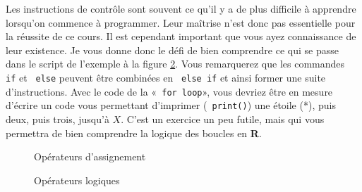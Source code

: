 \documentclass[10.5pt,a4paper]{article}
\newcommand{\rcode}[1]{\texttt{\color{rstudio} #1}}
\begin{document}
    Les instructions de contrôle sont souvent ce qu'il y a de plus difficile à apprendre lorsqu'on commence à programmer. Leur maîtrise n'est donc pas essentielle pour la réussite de ce cours. Il est cependant important que vous ayez connaissance de leur existence. Je vous donne donc le défi de bien comprendre ce qui se passe dans le script de l'exemple à la figure \ref{opeLogi}. Vous remarquerez que les commandes \rcode{if} et \rcode{else} peuvent être combinées en \rcode{else if} et ainsi former une suite d'instructions. Avec le code de la «\rcode{for loop}», vous devriez être en mesure d'écrire un code vous permettant d'imprimer (\rcode{print()}) une étoile (*), puis deux, puis trois, jusqu'à $X$. C'est un exercice un peu futile, mais qui vous permettra de bien comprendre la logique des boucles en \textbf{R}. 
    
    \begin{figure}[H]
    \centering
    \caption{Opérateurs d'assignement}
    \label{opeAssign}
    \end{figure}
    
    \begin{figure}[H]
    \centering
    \caption{Opérateurs logiques}
    \label{opeLogi}
    \end{figure}
  
\end{document}
